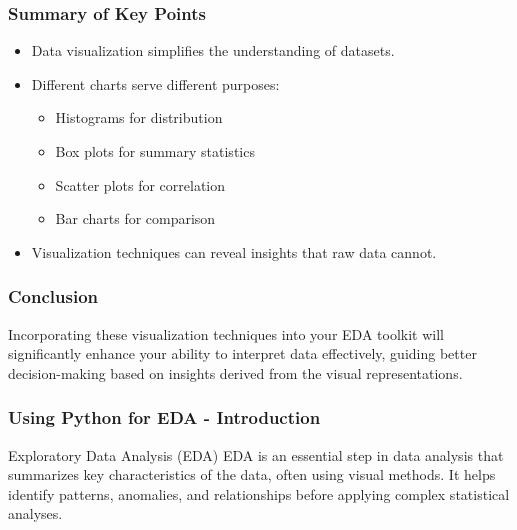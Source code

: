 \documentclass[aspectratio=169]{beamer}
\begin{document}
\begin{frame}
    \frametitle{Summary of Key Points}
    \begin{itemize}
        \item Data visualization simplifies the understanding of datasets.
        \item Different charts serve different purposes:
        \begin{itemize}
            \item Histograms for distribution
            \item Box plots for summary statistics
            \item Scatter plots for correlation
            \item Bar charts for comparison
        \end{itemize}
        \item Visualization techniques can reveal insights that raw data cannot.
    \end{itemize}
\end{frame}

\begin{frame}
    \frametitle{Conclusion}
    Incorporating these visualization techniques into your EDA toolkit will significantly enhance your ability to interpret data effectively, guiding better decision-making based on insights derived from the visual representations.
\end{frame}

\begin{frame}[fragile]
    \frametitle{Using Python for EDA - Introduction}
    \begin{block}{Exploratory Data Analysis (EDA)}
        EDA is an essential step in data analysis that summarizes key characteristics of the data, often using visual methods. It helps identify patterns, anomalies, and relationships before applying complex statistical analyses.
    \end{block}
\end{frame}
\end{document}
